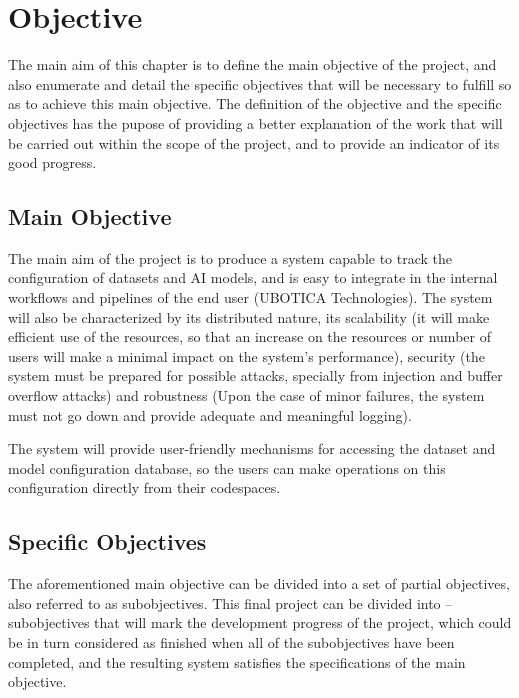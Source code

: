 \chapter{Objective}
\label{cap:Objective}

The main aim of this chapter is to define the main objective of the project, and also enumerate and detail the specific objectives that will be necessary to fulfill so as to
achieve this main objective. The definition of the objective and the specific objectives has the pupose of providing a better explanation of the work that will be carried out
within the scope of the project, and to provide an indicator of its good progress.

\section{Main Objective}

The main aim of the project is to produce a system capable to track the configuration of datasets and \acrshort{AI} models, and is easy to integrate in the internal workflows
and pipelines of the end user (UBOTICA Technologies). The system will also be characterized by its distributed nature, its scalability (it will
make efficient use of the resources, so that an increase on the resources or number of users will make a minimal impact on the system's performance), security (the system must
be prepared for possible attacks, specially from injection and buffer overflow attacks) and robustness (Upon the case of minor failures, the system must not go down and provide
adequate and meaningful logging).

The system will provide user-friendly mechanisms for accessing the dataset and model configuration database, so the users can make operations on this configuration directly from
their codespaces.

\section{Specific Objectives}

The aforementioned main objective can be divided into a set of partial objectives, also referred to as subobjectives. This final project can be divided into -- subobjectives
that will mark the development progress of the project, which could be in turn considered as finished when all of the subobjectives have been completed, and the resulting system
satisfies the specifications of the main objective.

